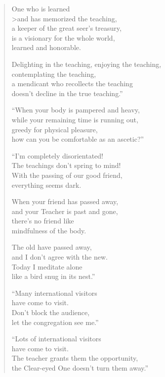 \documentclass[12pt,openany]{book}%
\begin{document}
\begin{verse}
One who is learned \\>and has memorized the teaching, \\
a keeper of the great seer’s treasury, \\
is a visionary for the whole world, \\
learned and honorable. 

Delighting in the teaching, enjoying the teaching, \\
contemplating the teaching, \\
a mendicant who recollects the teaching \\
doesn’t decline in the true teaching.” 

“When your body is pampered and heavy, \\
while your remaining time is running out, \\
greedy for physical pleasure, \\
how can you be comfortable as an ascetic?” 

“I’m completely disorientated! \\
The teachings don’t spring to mind! \\
With the passing of our good friend, \\
everything seems dark. 

When your friend has passed away, \\
and your Teacher is past and gone, \\
there’s no friend like \\
mindfulness of the body. 

The old have passed away, \\
and I don’t agree with the new. \\
Today I meditate alone \\
like a bird snug in its nest.” 

“Many international visitors \\
have come to visit. \\
Don’t block the audience, \\
let the congregation see me.” 

“Lots of international visitors \\
have come to visit. \\
The teacher grants them the opportunity, \\
the Clear-eyed One doesn’t turn them away.” 


\end{verse}
\end{document}
